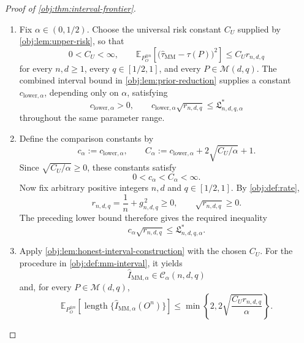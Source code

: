 \documentclass[11pt]{article}
\begin{document}
\begin{proof}[Proof of \cref{obj:thm:interval-frontier}]
\begin{enumerate}
\item Fix \(\alpha\in(0,1/2)\). Choose the universal risk constant \(C_U\) supplied by \cref{obj:lem:upper-risk}, so that
\[
0<C_U<\infty,
\qquad
\mathbb E_{P_O^{\otimes n}}
\left[
\bigl(\widehat\tau_{\mathrm{MM}}-\tau(P)\bigr)^2
\right]
\le C_U r_{n,d,q}
\]
for every \(n,d\ge1\), every \(q\in[1/2,1]\), and every \(P\in\mathcal M(d,q)\).
The combined interval bound in \cref{obj:lem:prior-reduction} supplies a constant \(c_{\mathrm{lower},\alpha}\), depending only on \(\alpha\), satisfying
\[
c_{\mathrm{lower},\alpha}>0,
\qquad
c_{\mathrm{lower},\alpha}\sqrt{r_{n,d,q}}
\le \mathfrak L^*_{n,d,q,\alpha}
\]
throughout the same parameter range.

\item Define the comparison constants by
\[
c_\alpha:=c_{\mathrm{lower},\alpha},
\qquad
C_\alpha:=c_{\mathrm{lower},\alpha}
       +2\sqrt{C_U/\alpha}+1.
\]
Since \(\sqrt{C_U/\alpha}\ge0\), these constants satisfy
\[
0<c_\alpha<C_\alpha<\infty.
\]
Now fix arbitrary positive integers \(n,d\) and \(q\in[1/2,1]\). By \cref{obj:def:rate},
\[
r_{n,d,q}=\frac1n+g_{n,d,q}^{\,2}\ge0,
\qquad
\sqrt{r_{n,d,q}}\ge0.
\]
The preceding lower bound therefore gives the required inequality
\[
c_\alpha\sqrt{r_{n,d,q}}
\le \mathfrak L^*_{n,d,q,\alpha}.
\]

\item Apply \cref{obj:lem:honest-interval-construction} with the chosen \(C_U\). For the procedure in \cref{obj:def:mm-interval}, it yields
\[
\widehat I_{\mathrm{MM},\alpha}\in\mathcal C_\alpha(n,d,q)
\]
and, for every \(P\in\mathcal M(d,q)\),
\[
\mathbb E_{P_O^{\otimes n}}
\left[
\operatorname{length}\{\widehat I_{\mathrm{MM},\alpha}(O^n)\}
\right]
\le
\min\left\{2,2\sqrt{\frac{C_Ur_{n,d,q}}{\alpha}}\right\}.
\]


\end{enumerate}
\end{proof}
\end{document}
